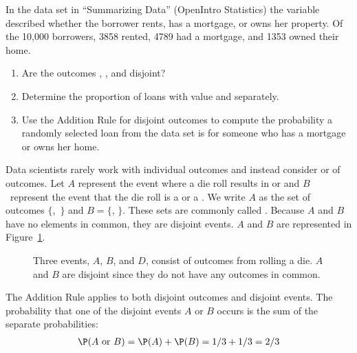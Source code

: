 \documentclass{ccg-topic}
\begin{document}
\begin{todo}
    In the  data set in ``Summarizing Data'' (OpenIntro Statistics)
the  variable described whether the borrower
rents, has a mortgage, or owns her property.
Of the 10,000 borrowers, 3858 rented, 4789 had a mortgage,
and 1353 owned their home.\footnotemark{}
\begin{enumerate}
\item Are the outcomes , , and  disjoint?
\item Determine the proportion of loans with value  and  separately.
\item Use the Addition Rule for disjoint outcomes to compute the probability a randomly selected loan from the data set is for someone who has a mortgage or owns her home.
\end{enumerate}
\end{todo}


Data scientists rarely work with individual outcomes and instead consider  or  of outcomes. Let $A$ represent the event where a die roll results in  or  and $B$~represent the event that the die roll is a  or a . We write $A$ as the set of outcomes $\{$,~$\}$ and $B=\{$, $\}$. These sets are commonly called . Because $A$ and $B$ have no elements in common, they are disjoint events. $A$ and $B$ are represented in Figure~\ref{disjointSets}.

\begin{figure}[hhh]
  \centering
  \caption{Three events, $A$, $B$, and $D$, consist of
      outcomes from rolling a die.
      $A$ and $B$ are disjoint since they do not have
      any outcomes in common.}
  \label{disjointSets}
\end{figure}

The Addition Rule applies to both disjoint outcomes and disjoint events. The probability that one of the disjoint events $A$ or $B$ occurs is the sum of the separate probabilities:
\begin{align*}
\P(A\text{ or }B) = \P(A) + \P(B) = 1/3 + 1/3 = 2/3
\end{align*}
\end{document}

